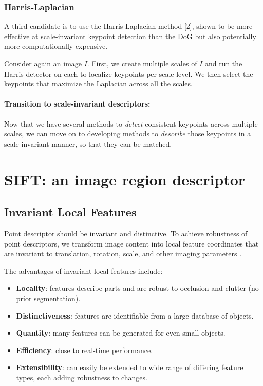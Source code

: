 \documentclass{article}
\begin{document}
\subsubsection{Harris-Laplacian}
A third candidate is to use the Harris-Laplacian method [2], shown to be more effective at scale-invariant keypoint detection than the DoG but also potentially more computationally expensive.

Consider again an image $I$. First, we create multiple scales of $I$ and run the Harris detector on each to localize keypoints per scale level. We then select the keypoints that maximize the Laplacian across all the scales.

\paragraph{Transition to scale-invariant descriptors:} Now that we have several methods to \textit{detect} consistent keypoints across multiple scales, we can move on to developing methods to \textit{describe} those keypoints in a scale-invariant manner, so that they can be matched.

\section{SIFT: an image region descriptor}

\subsection{Invariant Local Features}
Point descriptor should be invariant and distinctive. To achieve robustness of point descriptors, we transform image content into local feature coordinates that are invariant to translation, rotation, scale, and other imaging parameters .

The advantages of invariant local features include:
\begin{itemize}
  \item {\bf Locality}: features describe parts and are robust to occlusion and clutter (no prior segmentation).
  \item {\bf Distinctiveness}: features are identifiable from a large database of objects.
  \item {\bf Quantity}: many features can be generated for even small objects.
  \item {\bf Efficiency}: close to real-time performance.
  \item {\bf Extensibility}: can easily be extended to wide range of differing feature types, each adding robustness to changes.
\end{itemize}
\end{document}
